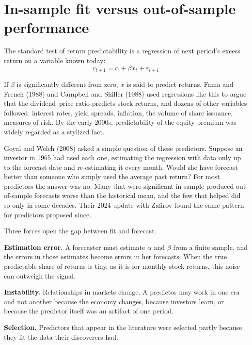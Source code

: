 \section{In-sample fit versus out-of-sample performance}
\label{sec:05-insample}

The standard test of return predictability is a regression of next period's excess return on a variable known today:
\begin{equation}
  r_{t+1} = \alpha + \beta x_t + \varepsilon_{t+1}
  \label{eq:05-pred}
\end{equation}

If $\beta$ is significantly different from zero, $x$ is said to predict returns. Fama and French (1988) and Campbell and Shiller (1988) used regressions like this to argue that the dividend--price ratio predicts stock returns, and dozens of other variables followed: interest rates, yield spreads, inflation, the volume of share issuance, measures of risk. By the early 2000s, predictability of the equity premium was widely regarded as a stylized fact.

Goyal and Welch (2008) asked a simple question of these predictors. Suppose an investor in 1965 had used each one, estimating the regression with data only up to the forecast date and re-estimating it every month. Would she have forecast better than someone who simply used the average past return? For most predictors the answer was no. Many that were significant in-sample produced out-of-sample forecasts worse than the historical mean, and the few that helped did so only in some decades. Their 2024 update with Zafirov found the same pattern for predictors proposed since.

Three forces open the gap between fit and forecast.

\textbf{Estimation error.} A forecaster must estimate $\alpha$ and $\beta$ from a finite sample, and the errors in those estimates become errors in her forecasts. When the true predictable share of returns is tiny, as it is for monthly stock returns, this noise can outweigh the signal. 

\textbf{Instability.} Relationships in markets change. A predictor may work in one era and not another because the economy changes, because investors learn, or because the predictor itself was an artifact of one period. 

\textbf{Selection.} Predictors that appear in the literature were selected partly because they fit the data their discoverers had. 

